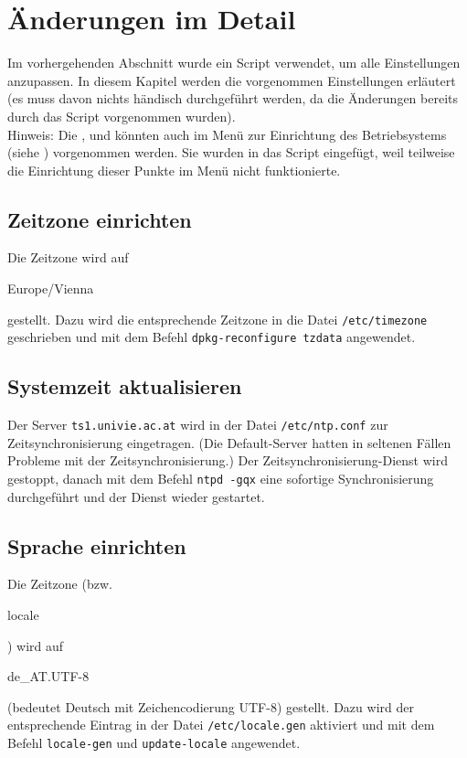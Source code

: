 \section{Änderungen im Detail}
Im vorhergehenden Abschnitt wurde ein Script verwendet, um alle Einstellungen anzupassen.
In diesem Kapitel werden die vorgenommen Einstellungen erläutert (es muss davon nichts händisch durchgeführt werden, da die Änderungen bereits durch das Script vorgenommen wurden).\\
Hinweis: Die ,  und  könnten auch im Menü zur Einrichtung des Betriebsystems (siehe ) vorgenommen werden.
Sie wurden in das Script eingefügt, weil teilweise die Einrichtung dieser Punkte im Menü nicht funktionierte.

\subsection{Zeitzone einrichten}
\label{sec:zeitzone}
Die Zeitzone wird auf \begin{em}Europe/Vienna\end{em} gestellt.
Dazu wird die entsprechende Zeitzone in die Datei \lstinline|/etc/timezone| geschrieben und mit dem Befehl \lstinline|dpkg-reconfigure tzdata| angewendet.

\subsection{Systemzeit aktualisieren}
\label{sec:zeitsync}
Der Server \lstinline|ts1.univie.ac.at| wird in der Datei \lstinline|/etc/ntp.conf| zur Zeitsynchronisierung eingetragen.
(Die Default-Server hatten in seltenen Fällen Probleme mit der Zeitsynchronisierung.)
Der Zeitsynchronisierung-Dienst wird gestoppt, danach mit dem Befehl \lstinline|ntpd -gqx| eine sofortige Synchronisierung durchgeführt und der Dienst wieder gestartet.

\subsection{Sprache einrichten}
\label{sec:sprache}
Die Zeitzone (bzw. \begin{em}locale\end{em}) wird auf \begin{em}de\_AT.UTF-8\end{em} (bedeutet Deutsch mit Zeichencodierung UTF-8) gestellt.
Dazu wird der entsprechende Eintrag in der Datei \lstinline|/etc/locale.gen| aktiviert und mit dem Befehl \lstinline|locale-gen| und \lstinline|update-locale| angewendet.

